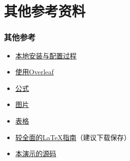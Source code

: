 \documentclass[xetex,mathserif,serif]{beamer}
\begin{document}
\section{其他参考资料}
\begin{frame} 
    \frametitle{其他参考} 
    \begin{itemize} 
        \item \href{https://zhuanlan.zhihu.com/p/38178015}{本地安装与配置过程}
        \item \href{https://zhuanlan.zhihu.com/p/67182742}{使用Overleaf}
        \item \href{https://blog.csdn.net/NSJim/article/details/109045914}{公式}
        \item \href{https://blog.csdn.net/qq_31347869/article/details/103832190}{图片}
        \item \href{https://blog.csdn.net/juechenyi/article/details/77116011}{表格}
        \item \href{https://ctan.org/tex-archive/info/lshort/chinese}{较全面的\LaTeX{}指南}（建议下载保存）
        \item \href{https://github.com/MonsTao/WritingPapersWithLatex}{本演示的源码}
    \end{itemize} 
\end{frame}
\end{document}
